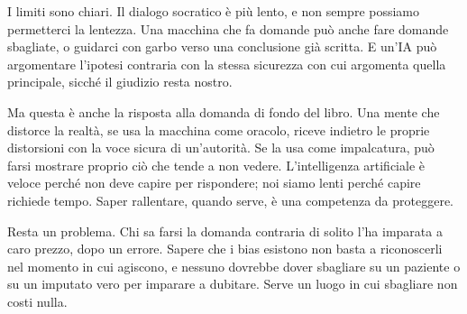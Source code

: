 I limiti sono chiari. Il dialogo socratico è più lento, e non sempre possiamo permetterci la lentezza. Una macchina che fa domande può anche fare domande sbagliate, o guidarci con garbo verso una conclusione già scritta. E un'IA può argomentare l'ipotesi contraria con la stessa sicurezza con cui argomenta quella principale, sicché il giudizio resta nostro.

Ma questa è anche la risposta alla domanda di fondo del libro. Una mente che distorce la realtà, se usa la macchina come oracolo, riceve indietro le proprie distorsioni con la voce sicura di un'autorità. Se la usa come impalcatura, può farsi mostrare proprio ciò che tende a non vedere. L'intelligenza artificiale è veloce perché non deve capire per rispondere; noi siamo lenti perché capire richiede tempo. Saper rallentare, quando serve, è una competenza da proteggere.

Resta un problema. Chi sa farsi la domanda contraria di solito l'ha imparata a caro prezzo, dopo un errore. Sapere che i bias esistono non basta a riconoscerli nel momento in cui agiscono, e nessuno dovrebbe dover sbagliare su un paziente o su un imputato vero per imparare a dubitare. Serve un luogo in cui sbagliare non costi nulla.

